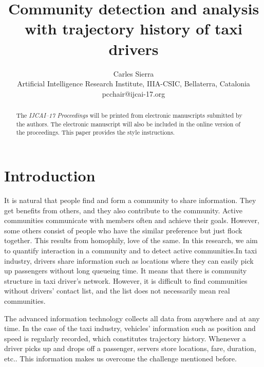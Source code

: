 \documentclass{article}
\title{Community detection and analysis with trajectory history of taxi drivers}
\author{Carles Sierra\\ 
Artificial Intelligence Research Institute, IIIA-CSIC, Bellaterra, Catalonia  \\
pcchair@ijcai-17.org}
\begin{document}
\maketitle

\begin{abstract}
  The {\it IJCAI--17 Proceedings} will be printed from electronic
  manuscripts submitted by the authors. The electronic manuscript will
  also be included in the online version of the proceedings. This paper
  provides the style instructions.
\end{abstract}

\section{Introduction} \label{sec:introduction}

It is natural that people find and form a community to share information. They get benefits from others, and they also contribute to the community. Active communities communicate with members often and achieve their goals. However, some others consist of people who have the similar preference but just flock together. This results from homophily, love of the same. In this research, we aim to quantify interaction in a community and to detect active communities.In taxi industry, drivers share information such as locations where they can easily pick up passengers without long queueing time. It means that there is community structure in taxi driver's network. However, it is difficult to find communities without drivers' contact list, and the list does not necessarily mean real communities.

The advanced information technology collects all data from anywhere and at any time. In the case of the taxi industry, vehicles' information such as position and speed is regularly recorded, which constitutes trajectory history. Whenever a driver picks up and drops off a passenger, servers store locations, fare, duration, etc.. This information makes us overcome the challenge mentioned before.
\end{document}
